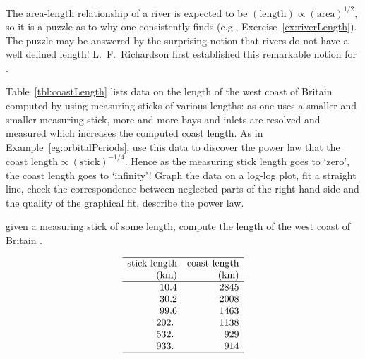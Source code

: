\begin{exercise} \label{ex:coastlength} 
The area-length relationship of a river is expected to be \((\text{length})\propto(\text{area})^{1/2}\), so it is a puzzle as to why one consistently finds  (e.g., Exercise~\ref{ex:riverLength}).
The puzzle may be answered by the surprising notion that rivers do not have a well defined length!
L.~F.~Richardson first established this remarkable notion for .

Table~\ref{tbl:coastLength} lists data on the length of the west coast of Britain computed by using measuring sticks of various lengths: as one uses a smaller and smaller measuring stick, more and more bays and inlets are resolved and measured which increases the computed coast length. 
\setbox\ajrqrbox\hbox{}%
\marginpar{\usebox{\ajrqrbox\\[2ex]}}%
As in Example~\ref{eg:orbitalPeriods}, use this data to discover the power law that the coast \(\text{length}\propto(\text{stick})^{-1/4}\).
Hence as the measuring stick length goes to `zero', the coast length goes to `infinity'!  
Graph the data on a log-log plot, fit a straight line, check the correspondence between neglected parts of the right-hand side and the quality of the graphical fit, describe the power law.
\begin{table}
\caption{given a measuring stick of some length, compute the length of the west coast of Britain \cite[Plate~33]{Mandelbrot1982}.}
\label{tbl:coastLength}
\begin{equation*}
\begin{array}{rr} \hline
\text{stick length}&\text{coast length}\\
(\text{km})&\text{(km)}\\\hline
     10.4 & 2845 \\
     30.2 & 2008 \\
     99.6 & 1463 \\
    202.\ & 1138 \\
    532.\ &  929 \\
    933.\ &  914 \\
\hline
\end{array}
\end{equation*}
\end{table}%
\end{exercise}




